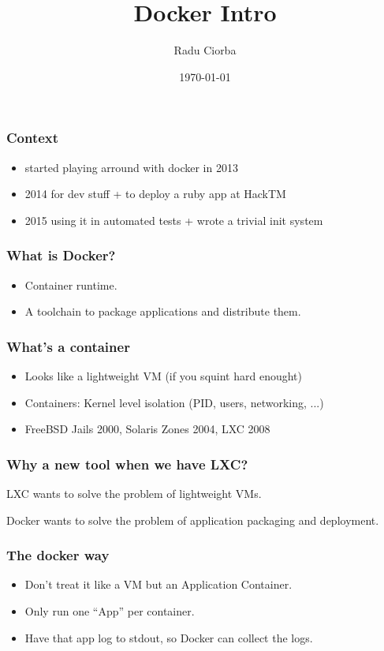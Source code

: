 \documentclass{beamer}
\title[Docker]{Docker Intro} %
\author{Radu Ciorba} %
\institute[Spyhce] %
{
  Spyhce \\ %
  \medskip
  \textit{radu.ciorba@spyhce.com} %
}
\date{\today} %
\begin{document}
\begin{frame}
  \titlepage %
\end{frame}

\begin{frame}
  \frametitle{Context}
  \begin{itemize}
  \item started playing arround with docker in 2013
  \item 2014 for dev stuff + to deploy a ruby app at HackTM
  \item 2015 using it in automated tests + wrote a trivial init system
  \end{itemize}
\end{frame}

\begin{frame}
  \frametitle{What is Docker?}
  \begin{itemize}
  \item Container runtime.
  \item A toolchain to package applications and distribute them.
  \end{itemize}
\end{frame}

\begin{frame}
  \frametitle{What's a container}
  \begin{itemize}
  \item Looks like a lightweight VM (if you squint hard enought)
  \item Containers: Kernel level isolation (PID, users, networking, ...)
  \item FreeBSD Jails 2000, Solaris Zones 2004, LXC 2008
  \end{itemize}
\end{frame}

\begin{frame}
  \frametitle{Why a new tool when we have LXC?}
  \begin{center}
  LXC wants to solve the problem of lightweight VMs. \par
  \noindent
  Docker wants to solve the problem of application packaging and deployment.
  \end{center}
\end{frame}

\begin{frame}
  \frametitle{The docker way}
  \begin{itemize}
  \item Don't treat it like a VM but an Application Container.
  \item Only run one ``App'' per container.
  \item Have that app log to stdout, so Docker can collect the logs.
  \end{itemize}
\end{frame}
\end{document}

